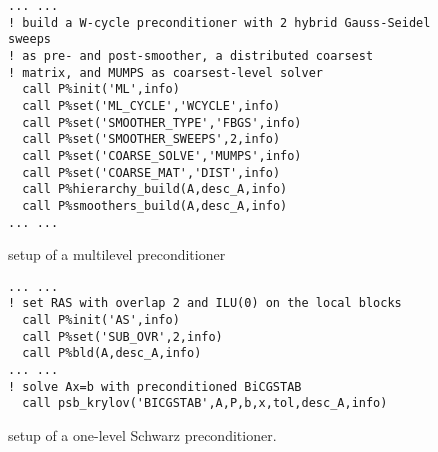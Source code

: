 \begin{figure}[h!]
\begin{center}
\begin{minipage}{.90\textwidth}
{\small
\begin{verbatim}
... ...
! build a W-cycle preconditioner with 2 hybrid Gauss-Seidel sweeps
! as pre- and post-smoother, a distributed coarsest
! matrix, and MUMPS as coarsest-level solver
  call P%init('ML',info)
  call P%set('ML_CYCLE','WCYCLE',info)
  call P%set('SMOOTHER_TYPE','FBGS',info)
  call P%set('SMOOTHER_SWEEPS',2,info)
  call P%set('COARSE_SOLVE','MUMPS',info)
  call P%set('COARSE_MAT','DIST',info)
  call P%hierarchy_build(A,desc_A,info)
  call P%smoothers_build(A,desc_A,info)
... ...
\end{verbatim}
}
\end{minipage}
\caption{setup of a multilevel preconditioner\label{fig:ex3}}
\end{center}
\end{figure}

\begin{figure}[h!]
\begin{center}
\begin{minipage}{.90\textwidth}
{\small
\begin{verbatim}
... ...
! set RAS with overlap 2 and ILU(0) on the local blocks
  call P%init('AS',info)
  call P%set('SUB_OVR',2,info)
  call P%bld(A,desc_A,info)
... ...
! solve Ax=b with preconditioned BiCGSTAB
  call psb_krylov('BICGSTAB',A,P,b,x,tol,desc_A,info)
\end{verbatim}
}
\end{minipage}
\caption{setup of a one-level Schwarz preconditioner.\label{fig:ex4}}
\end{center}
\end{figure}


